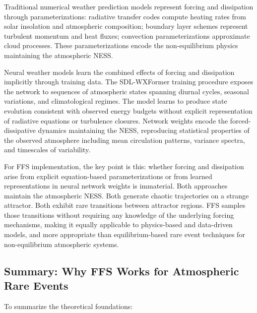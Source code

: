 \documentclass[11pt]{article}
\begin{document}
Traditional numerical weather prediction models represent forcing and dissipation through parameterizations: radiative transfer codes compute heating rates from solar insolation and atmospheric composition; boundary layer schemes represent turbulent momentum and heat fluxes; convection parameterizations approximate cloud processes. These parameterizations encode the non-equilibrium physics maintaining the atmospheric NESS.

Neural weather models learn the combined effects of forcing and dissipation implicitly through training data. The SDL-WXFormer training procedure exposes the network to sequences of atmospheric states spanning diurnal cycles, seasonal variations, and climatological regimes. The model learns to produce state evolution consistent with observed energy budgets without explicit representation of radiative equations or turbulence closures. Network weights encode the forced-dissipative dynamics maintaining the NESS, reproducing statistical properties of the observed atmosphere including mean circulation patterns, variance spectra, and timescales of variability.

For FFS implementation, the key point is this: whether forcing and dissipation arise from explicit equation-based parameterizations or from learned representations in neural network weights is immaterial. Both approaches maintain the atmospheric NESS. Both generate chaotic trajectories on a strange attractor. Both exhibit rare transitions between attractor regions. FFS samples those transitions without requiring any knowledge of the underlying forcing mechanisms, making it equally applicable to physics-based and data-driven models, and more appropriate than equilibrium-based rare event techniques for non-equilibrium atmospheric systems.

\subsection{Summary: Why FFS Works for Atmospheric Rare Events}

To summarize the theoretical foundations:
\end{document}
